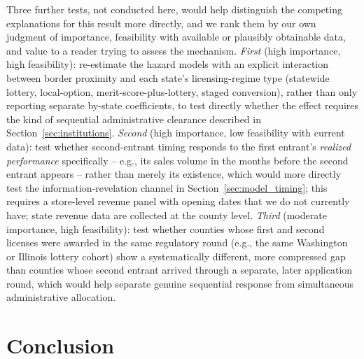 \documentclass[12pt]{article}
\begin{document}
Three further tests, not conducted here, would help distinguish the competing explanations for this result
more directly, and we rank them by our own judgment of importance, feasibility with available or plausibly
obtainable data, and value to a reader trying to assess the mechanism. \emph{First} (high importance, high
feasibility): re-estimate the hazard models with an explicit interaction between border proximity and each
state's licensing-regime type (statewide lottery, local-option, merit-score-plus-lottery, staged
conversion), rather than only reporting separate by-state coefficients, to test directly whether the effect
requires the kind of sequential administrative clearance described in Section~\ref{sec:institutions}.
\emph{Second} (high importance, low feasibility with current data): test whether second-entrant timing
responds to the first entrant's \emph{realized performance} specifically -- e.g., its sales volume in the
months before the second entrant appears -- rather than merely its existence, which would more directly test
the information-revelation channel in Section~\ref{sec:model_timing}; this requires a store-level revenue
panel with opening dates that we do not currently have; state revenue data are collected at the county level.
\emph{Third} (moderate importance, high feasibility): test whether counties whose first and second licenses
were awarded in the same regulatory round (e.g., the same Washington or Illinois lottery cohort) show a
systematically different, more compressed gap than counties whose second entrant arrived through a separate,
later application round, which would help separate genuine sequential response from simultaneous
administrative allocation.

\section{Conclusion}
\label{sec:conclusion}
\end{document}
